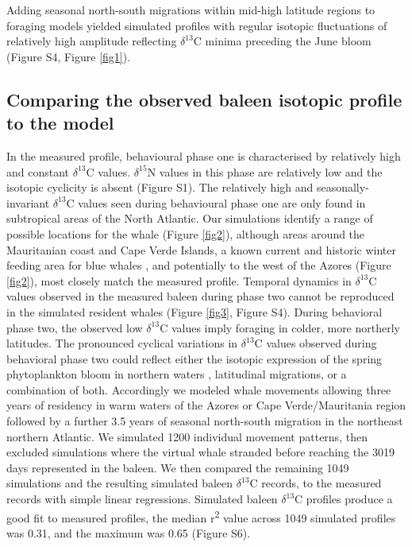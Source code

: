 \documentclass[a4paper,12pt]{article}
\begin{document}
Adding seasonal north-south migrations within mid-high latitude regions to foraging models yielded simulated profiles with regular isotopic fluctuations of relatively high amplitude reflecting $\delta^{13}$C minima preceding the June bloom (Figure S4, Figure \ref{fig1}). 

\subsection{Comparing the observed baleen isotopic profile to the model}
In the measured profile, behavioural phase one is characterised by relatively high and constant $\delta^{13}$C values.
$\delta^{15}$N values in this phase are relatively low and the isotopic cyclicity is absent (Figure S1).  
The relatively high and seasonally-invariant $\delta^{13}$C values seen during behavioural phase one are only found in subtropical areas of the North Atlantic. 
Our simulations identify a range of possible locations for the whale (Figure \ref{fig2}), although areas around the Mauritanian coast and Cape Verde Islands, a known current and historic winter feeding area for blue whales \citep{baines2014upwellings,reeves2004historical}, and potentially to the west of the Azores (Figure \ref{fig2}), most closely match the measured profile.
Temporal dynamics in $\delta^{13}$C values observed in the measured baleen during phase two cannot be reproduced in the simulated resident whales (Figure \ref{fig3}, Figure S4).
During behavioral phase two, the observed low $\delta^{13}$C values imply foraging in colder, more northerly latitudes. 
The pronounced cyclical variations in $\delta^{13}$C values observed during behavioral phase two could reflect either the isotopic expression of the spring phytoplankton bloom in northern waters \citep{magozzi2017using}, latitudinal migrations, or a combination of both. 
Accordingly we modeled whale movements allowing three years of residency in warm waters of the Azores or Cape Verde/Mauritania region followed by a further 3.5 years of seasonal north-south migration in the northeast northern Atlantic. 
We simulated 1200 individual movement patterns, then excluded simulations where the virtual whale stranded before reaching the 3019 days represented in the baleen.
We then compared the remaining 1049 simulations and the resulting simulated baleen $\delta^{13}$C records, to the measured records with simple linear regressions. 
Simulated baleen $\delta^{13}$C profiles produce a good fit to measured profiles, the median r\textsuperscript{2} value across 1049 simulated profiles was 0.31, and the maximum was 0.65 (Figure S6). 
\end{document}
